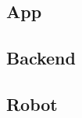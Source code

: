 \begin{comment}
Client
Server
Interpreter
Commandostruktur
\end{comment}

\subsection{App}

\begin{comment}
Aufbau
MVVM
Binding
GUI
Library
PageModel
\end{comment}

\subsection{Backend}

\begin{comment}
Aufbau
Interpreter
Mechanismen
GUI
\end{comment}

\subsection{Robot}

\begin{comment}
Aufbau
Robot
RobotController
EV3 Library
GUI
\end{comment}